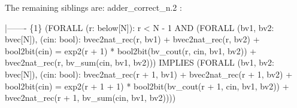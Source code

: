 The remaining siblings are: 
adder_correct_n.2 :   

  |-------
\{1\}   (FORALL (r: below[N]):
         r < N - 1
           AND (FORALL (bv1, bv2: bvec[N]), (cin: bool):
                  bvec2nat_rec(r, bv1) + bvec2nat_rec(r, bv2)
                    + bool2bit(cin)
                    = exp2(r + 1) * bool2bit(bv_cout(r, cin, bv1, bv2))
                        + bvec2nat_rec(r, bv_sum(cin, bv1, bv2)))
           IMPLIES (FORALL (bv1, bv2: bvec[N]), (cin: bool):
                      bvec2nat_rec(r + 1, bv1)
                        + bvec2nat_rec(r + 1, bv2)
                        + bool2bit(cin)
                        = exp2(r + 1 + 1)
                            * bool2bit(bv_cout(r + 1, cin, bv1, bv2))
                            +
                            bvec2nat_rec(r + 1,
                                         bv_sum(cin, bv1, bv2))))
